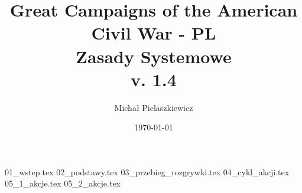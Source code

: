 \documentclass[10pt,twoside,a4paper,table]{article}
\title{Great Campaigns of the American Civil War - PL \\ Zasady Systemowe \\ v. 1.4}
\author{Michał Pielaszkiewicz}
\date{\today}
\newcommand\emptypage{
    \null
    \thispagestyle{empty}
    \addtocounter{page}{-1}
    \newpage
}
\begin{document}
    \maketitle
    \emptypage
    \tableofcontents
    \emptypage
    \begin{multicols*}{2}
        {01_wstep.tex}
        {02_podstawy.tex}
        {03_przebieg_rozgrywki.tex}
        {04_cykl_akcji.tex}
		{05_1_akcje.tex}
		{05_2_akcje.tex}
    \end{multicols*}
\end{document}
